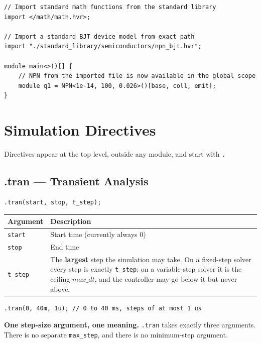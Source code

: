 \documentclass[11pt, a4paper]{article}
\newcommand{\code}[1]{\texttt{\small #1}}
\begin{document}
\begin{lstlisting}
// Import standard math functions from the standard library
import </math/math.hvr>; 

// Import a standard BJT device model from exact path
import "./standard_library/semiconductors/npn_bjt.hvr";

module main<>()[] {
    // NPN from the imported file is now available in the global scope
    module q1 = NPN<1e-14, 100, 0.026>()[base, coll, emit];
}
\end{lstlisting}

\section{Simulation Directives}

Directives appear at the top level, outside any module, and start with
\code{.}

\subsection{.tran — Transient Analysis}

\begin{lstlisting}
.tran(start, stop, t_step);
\end{lstlisting}

\begin{center}
\begin{tabular}{@{} L{2.4cm} L{9.6cm} @{}}
  \toprule
  \textbf{Argument} & \textbf{Description} \\
  \midrule
  \code{start}  & Start time (currently always 0) \\
  \code{stop}   & End time \\
  \code{t\_step} & The \textbf{largest} step the simulation may take. On a
                   fixed-step solver every step is exactly \code{t\_step}; on a
                   variable-step solver it is the ceiling \(max\_dt\), and the
                   controller may go below it but never above. \\
  \bottomrule
\end{tabular}
\end{center}

\begin{lstlisting}
.tran(0, 40m, 1u); // 0 to 40 ms, steps of at most 1 us
\end{lstlisting}

\textbf{One step-size argument, one meaning.} \code{.tran} takes exactly three
arguments. There is no separate \code{max\_step}, and there is no
minimum-step argument.
\end{document}
